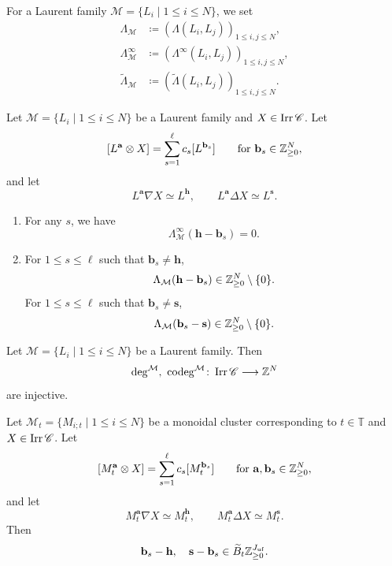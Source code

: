 For a Laurent family
$\mathcal{M} = \{L_i \mid 1 \leq i \leq N\}$, we set
\[
\begin{aligned}
\Lambda_{\mathcal{M}}
&\coloneq (\Lambda(L_i, L_j))_{1 \leq i, j \leq N}, \\
\Lambda^{\infty}_{\mathcal{M}}
&\coloneq (\Lambda^{\infty}(L_i, L_j))_{1 \leq i, j \leq N}, \\
\widetilde{\Lambda}_{\mathcal{M}}
&\coloneq (\widetilde{\Lambda}(L_i, L_j))_{1 \leq i, j \leq N}.
\end{aligned}
\]

\begin{Prop}
\label{Prop : Lambda inequalities for Laurent expansions}
Let $\mathcal{M} = \{L_i \mid 1 \leq i \leq N\}$
be a Laurent family and $X \in \mathop{\mathrm{Irr}}\nolimits\mathscr{C}$.
Let
\[
[L^{\mathbf{a}} \otimes X]
= \sum_{s=1}^{\ell}c_s[L^{\mathbf{b}_s}]
\qquad\text{for }\mathbf{b}_s \in \mathbb{Z}_{\geq 0}^N,
\]
and let
\[
L^{\mathbf{a}} \nabla X \simeq L^{\mathbf{h}},
\qquad
L^{\mathbf{a}} \Delta X \simeq L^{\mathbf{s}}.
\]
\begin{enumerate}
    \item[(i)] For any $s$, we have
    \[
    \Lambda^{\infty}_{\mathcal{M}}(\mathbf{h} - \mathbf{b}_s) = 0.
    \]
    \item[(ii)] 
    For $1\leq s \leq \ell$ such that $\mathbf{b}_s \neq \mathbf{h}$, 
    \[
    \Lambda_{\mathcal{M}}(\mathbf{h} - \mathbf{b}_s)\in \mathbb{Z}_{\geq 0}^N\setminus \{0\}. 
    \]
    For $1\leq s \leq \ell$ such that $\mathbf{b}_s \neq \mathbf{s}$, 
    \[
    \Lambda_{\mathcal{M}}(\mathbf{b}_s - \mathbf{s})\in \mathbb{Z}_{\geq 0}^N\setminus \{0\}. 
    \]
\end{enumerate}
\end{Prop}

\begin{Lem}
\label{Lem : injectivity of degrees for Laurent families}
Let $\mathcal{M} = \{L_i \mid 1 \leq i \leq N\}$
be a Laurent family.
Then
\[
\deg^{\mathcal{M}},\ \operatorname{codeg}^{\mathcal{M}}
\colon \Irr\mathscr{C} \longrightarrow \Z^N
\]
are injective.
\end{Lem}

\begin{Prop}
\label{Prop : support of Laurent expansions at monoidal clusters}
Let $\mathcal{M}_t = \{M_{i;t} \mid 1 \leq i \leq N\}$
be a monoidal cluster corresponding to $t \in \mathbb{T}$
and $X \in \mathop{\mathrm{Irr}}\nolimits\mathscr{C}$.
Let
\[
[M_t^{\mathbf{a}} \otimes X]
= \sum_{s=1}^{\ell}c_s[M_t^{\mathbf{b}_s}]
\qquad\text{for }\mathbf{a}, \mathbf{b}_s \in \mathbb{Z}_{\geq 0}^N,
\]
and let
\[
M_t^{\mathbf{a}} \nabla X \simeq M_t^{\mathbf{h}},
\qquad
M_t^{\mathbf{a}} \Delta X \simeq M_t^{\mathbf{s}}.
\]
Then
\[
\mathbf{b}_s - \mathbf{h},\quad \mathbf{s} - \mathbf{b}_s
\in \widetilde{B}_t\mathbb{Z}_{\geq 0}^{J_{\mathrm{uf}}}.
\]
\end{Prop}

